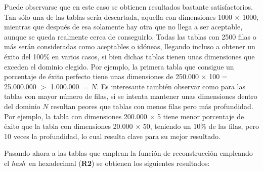 \documentclass[12pt,spanish,listoffigures,listoftables]{tfgetsinf}
\newcommand{\hash}{\textit{hash}}
\begin{document}
Puede observarse que en este caso se obtienen resultados bastante satisfactorios. Tan sólo una de las tablas sería descartada, aquella con dimensiones 1000 $\times$ 1000, mientras que después de esa solamente hay otra que no llega a ser aceptable, aunque se queda realmente cerca de conseguirlo. Todas las tablas con 2500 filas o más serán consideradas como aceptables o idóneas, llegando incluso a obtener un éxito del 100\% en varios casos, si bien dichas tablas tienen unas dimensiones que exceden el dominio elegido. Por ejemplo, la primera tabla que consigue un porcentaje de éxito perfecto tiene unas dimensiones de 250.000 $\times$ 100 = 25.000.000 $>$ 1.000.000 $= N$. Es interesante también observar como para las tablas con mayor número de filas, si se intenta mantener unas dimensiones dentro del dominio $N$ resultan peores que tablas con menos filas pero más profundidad. Por ejemplo, la tabla con dimensiones 200.000 $\times$ 5 tiene menor porcentaje de éxito que la tabla con dimensiones 20.000 $\times$ 50, teniendo un 10\% de las filas, pero 10 veces la profundidad, lo cual resulta clave para su mejor resultado.

Pasando ahora a las tablas que emplean la función de reconstrucción empleando el \hash~en hexadecimal (\textbf{R2}) se obtienen los siguientes resultados:

\end{document}
